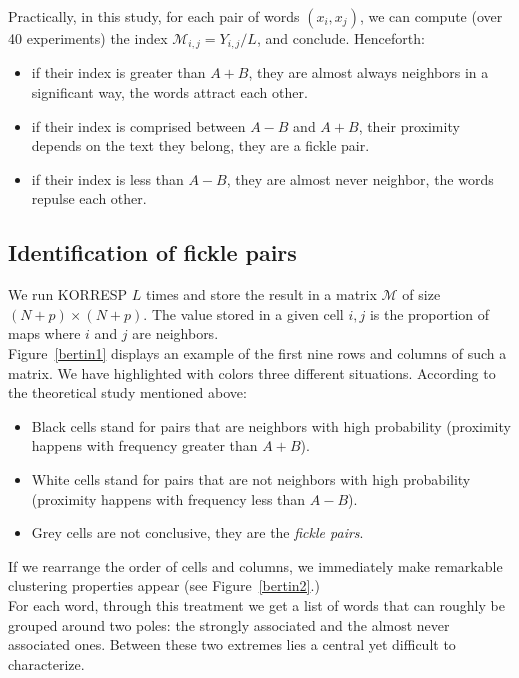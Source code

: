 \documentclass[preprint]{elsarticle}
\begin{document}
Practically, in this study, for each pair of words $(x_i,x_j)$, we can compute (over 40 experiments) the index $\mathcal{M}_{i,j} = Y_{i,j}/L$, and conclude. Henceforth:\\
 
\begin{itemize}
\item if their index is greater than $A + B$, they are almost always neighbors in a significant way, the words attract each other.
\item if their index is comprised between $A - B$ and $A+B$, their proximity depends on the text they belong, they are a fickle pair.
\item if their index is less than $A - B$, they are almost never neighbor, the words repulse each other.
\end{itemize}

\subsection{Identification of fickle pairs}

We run KORRESP $L$ times and store the result in a matrix $\mathcal{M}$ of size $(N+p)\times(N+p)$. The value stored in a given cell $i,j$ is the proportion of maps where $i$ and $j$ are neighbors.\\

Figure~\ref{bertin1} displays an example of the  first nine rows and columns of such a matrix. We have highlighted with colors three different situations. According to the theoretical study mentioned above:

\begin{itemize}
	\item Black cells stand for pairs that are neighbors with high probability (proximity happens with frequency greater than $A+B$).
	\item White cells stand for pairs that are not neighbors with high probability (proximity happens with frequency less than $A-B$).
	\item Grey cells are not conclusive, they are the \textit{fickle pairs}.
\end{itemize}

If we rearrange the order of cells and columns, we immediately make remarkable clustering properties appear (see Figure~\ref{bertin2}.)\\

For each word, through this treatment we get a list of words that can roughly be grouped around two poles: the strongly associated and the almost never associated ones.  Between these two extremes lies a central yet difficult to characterize.
\end{document}

